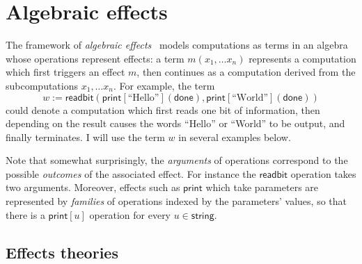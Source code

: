 \documentclass[11pt,oneside]{book}
\theoremstyle{definition}
\newcommand{\kw}[1]{\ensuremath{ \mathsf{#1} }}
\begin{document}
%



\section{Algebraic effects} \label{sec:eff} %


The framework of \emph{algebraic effects}~\citep{effadq}
models computations as terms in an algebra
whose operations represent effects:
a term $m(x_1, \ldots x_n)$
represents a computation which first
triggers an effect $m$,
then continues as a computation derived from
the subcomputations $x_1, \ldots x_n$.
For example,
the term
\[
  w :=
    \kw{readbit}(
      \kw{print}[\text{``Hello''}](\kw{done}),
      \kw{print}[\text{``World''}](\kw{done}))
\]
could denote a computation which
first reads one bit of information,
then depending on the result
causes the words ``Hello'' or ``World'' to be output,
and finally terminates.
I will use the term $w$ in several examples below.

Note that somewhat surprisingly,
the \emph{arguments} of operations correspond to
the possible \emph{outcomes} of the associated effect.
For instance the $\kw{readbit}$ operation takes two arguments.
Moreover,
effects such as $\kw{print}$
which take parameters
are represented by \emph{families}
of operations indexed by the parameters' values,
so that there is a $\kw{print}[u]$
operation for every $u \in \kw{string}$.


\subsection{Effects theories} %
\end{document}
